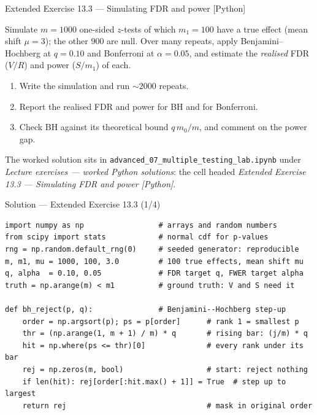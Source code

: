 \documentclass[aspectratio=169,11pt]{beamer}
\begin{document}
\begin{frame}{Extended Exercise 13.3 --- Simulating FDR and power [Python]}
\begin{longexercise}
  Simulate $m=1000$ one-sided $z$-tests of which $m_1=100$ have a true effect
  (mean shift $\mu=3$); the other $900$ are null. Over many repeats, apply
  Benjamini--Hochberg at $q=0.10$ and Bonferroni at $\alpha=0.05$, and estimate the
  \emph{realised} FDR ($V/R$) and power ($S/m_1$) of each.
  \begin{enumerate}
    \item Write the simulation and run $\sim2000$ repeats.
    \item Report the realised FDR and power for BH and for Bonferroni.
    \item Check BH against its theoretical bound $q\,m_0/m$, and comment on the power gap.
  \end{enumerate}
\end{longexercise}
\begin{labnote}
  The worked solution sits in \texttt{advanced\_07\_multiple\_testing\_lab.ipynb} under
  \emph{Lecture exercises --- worked Python solutions}: the cell headed
  \emph{Extended Exercise 13.3 --- Simulating FDR and power [Python]}.
\end{labnote}
\end{frame}

\begin{frame}[fragile]{Solution --- Extended Exercise 13.3 (1/4)}
\begin{solutionbox}
\begin{lstlisting}
import numpy as np                 # arrays and random numbers
from scipy import stats            # normal cdf for p-values
rng = np.random.default_rng(0)     # seeded generator: reproducible
m, m1, mu = 1000, 100, 3.0         # 100 true effects, mean shift mu
q, alpha  = 0.10, 0.05             # FDR target q, FWER target alpha
truth = np.arange(m) < m1          # ground truth: V and S need it

def bh_reject(p, q):               # Benjamini--Hochberg step-up
    order = np.argsort(p); ps = p[order]      # rank 1 = smallest p
    thr = (np.arange(1, m + 1) / m) * q       # rising bar: (j/m) * q
    hit = np.where(ps <= thr)[0]              # every rank under its bar
    rej = np.zeros(m, bool)                   # start: reject nothing
    if len(hit): rej[order[:hit.max() + 1]] = True  # step up to largest
    return rej                                # mask in original order
\end{lstlisting}
\end{solutionbox}
\end{frame}
\end{document}
